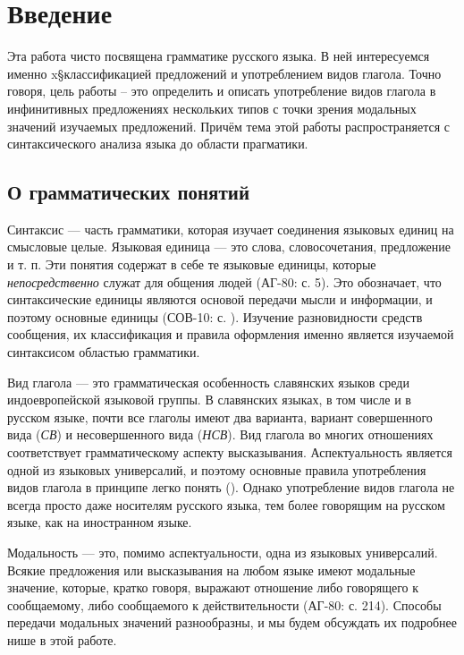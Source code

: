 \section{Введение}

Эта работа чисто посвящена грамматике русского языка. В ней интересуемся именно x§классификацией предложений и употреблением видов глагола. Точно говоря, цель работы -- это определить и описать употребление видов глагола в инфинитивных предложениях нескольких типов с точки зрения модальных значений изучаемых предложений. Причём тема этой работы распространяется с синтаксического анализа языка до области прагматики.

\subsection{О грамматических понятий}

Синтаксис --- часть грамматики, которая изучает соединения языковых единиц на смысловые целые. Языковая единица --- это слова, словосочетания, предложение и т. п. Эти понятия содержат в себе те языковые единицы, которые \textit{непосредственно} служат для общения людей (АГ-80: с. 5). Это обозначает, что синтаксические единицы являются основой передачи мысли и информации, и поэтому основные единицы (СОВ-10: с. ). Изучение разновидности средств сообщения, их классификация и правила оформления именно является изучаемой синтаксисом областью грамматики.

Вид глагола --- это грамматическая особенность славянских языков среди индоевропейской языковой группы. В славянских языках, в том числе и в русском языке, почти все глаголы имеют два варианта, вариант совершенного вида (\textit{СВ}) и несовершенного вида (\textit{НСВ}). Вид глагола во многих отношениях соответствует грамматическому аспекту высказывания. Аспектуальность является одной из языковых универсалий, и поэтому основные правила употребления видов глагола в принципе легко понять (). Однако употребление видов глагола не всегда просто даже носителям русского языка, тем более говорящим на русском языке, как на иностранном языке.

Модальность --- это, помимо аспектуальности, одна из языковых универсалий. Всякие предложения или высказывания на любом языке имеют модальные значение, которые, кратко говоря, выражают отношение либо говорящего к сообщаемому, либо сообщаемого к действительности (АГ-80: с. 214). Способы передачи модальных значений разнообразны, и мы будем обсуждать их подробнее нише в этой работе.

